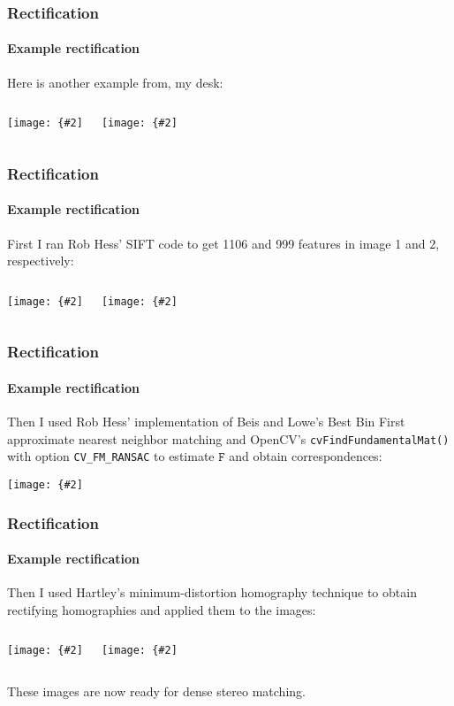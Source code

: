 \documentclass[aspectratio=169]{beamer}
\newcommand{\mat}[1]{\mathtt{#1}}
\newcommand{\myfig}[3]{\centerline{\texttt{[image: \{\#2]}}}
    \centerline{\scriptsize #3}}
\begin{document}
\begin{frame}
\frametitle{Rectification}
\framesubtitle{Example rectification}

Here is another example from, my desk:

\medskip

\begin{columns}
\column{2.2in}
\myfig{2in}{desk1}{}
\column{2.2in}
\myfig{2in}{desk2}{}
\end{columns}

\end{frame}

\begin{frame}
\frametitle{Rectification}
\framesubtitle{Example rectification}

First I ran Rob Hess' SIFT code to get 1106 and 999 features in image
1 and 2, respectively:

\medskip

\begin{columns}
\column{2.2in}
\myfig{2in}{desk1-sift}{}
\column{2.2in}
\myfig{2in}{desk2-sift}{}
\end{columns}

\end{frame}

\begin{frame}
\frametitle{Rectification}
\framesubtitle{Example rectification}

Then I used Rob Hess' implementation of Beis and Lowe's Best Bin First
approximate nearest neighbor matching and OpenCV's
\texttt{cvFindFundamentalMat()} with option \texttt{CV\_FM\_RANSAC} to
estimate $\mat{F}$ and obtain correspondences:

\medskip

\myfig{2in}{desk2-from1-corr}{}

\end{frame}

\begin{frame}
\frametitle{Rectification}
\framesubtitle{Example rectification}

Then I used Hartley's minimum-distortion homography technique to
obtain rectifying homographies and applied them to the images:

\medskip

\begin{columns}
\column{1.9in}
\myfig{1.8in}{desk1_rect}{}
\column{2.6in}
\myfig{2.5in}{desk2_rect}{}
\end{columns}

\medskip

These images are now ready for dense stereo matching.

\end{frame}
\end{document}
